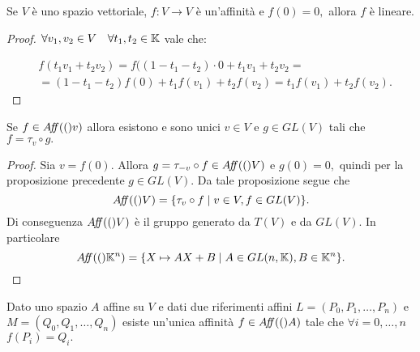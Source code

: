 \documentclass[a4paper,12pt]{article}
\newcommand{\Got}[1]{#1}
\newcommand{\got}[1]{{#1}}
\begin{document}
 \begin{proposition}
 \Got{Se} $\got{V}$ \Got{è uno spazio vettoriale,} $\got{f:V\to V}$ \Got{è un'affinità e} $\got{f(0)=0,}$ \Got{allora}
 $\got{f}$ \Got{è lineare.}
 \end{proposition}
 \begin{proof}
 \Got{}$\got{\forall v_1,v_2\in V\quad\forall t_1,t_2\in \K}$ \Got{vale che:}
 
 \begin{eqnarray*}
	& \got{f(t_1v_1+t_2v_2)=f((1-t_1-t_2)\cdotp 0+t_1v_1+t_2v_2=}\\
	& \got{=(1-t_1-t_2)f(0)+t_1f(v_1)+t_2f(v_2)=t_1f(v_1)+t_2f(v_2).}
 \end{eqnarray*}
 \end{proof}
 
 \begin{proposition}
 \Got{Se} $\got{f\in \Aff(v)}$ \Got{allora esistono e sono unici} $\got{v\in V}$ \Got{e} $\got{g\in GL(V)}$ \Got{tali che}
 $\got{f=\tau_v}\circ\got{ g.}$
 \end{proposition}
 
 \begin{proof}
 \Got{Sia} $\got{v=f(0).}$ \Got{Allora} $\got{g=\tau_{-v}}\circ\got{ f\in \Aff(V)}$ \Got{e} $\got{g(0)=0,}$
 \Got{quindi per la proposizione precedente} $\got{g\in GL(V).}$
 \Got{Da tale proposizione segue che} 
 $$
	\got{\Aff(V)=\{\tau_v}\circ\got{ f\;|\;v\in V,f\in GL(V)\}.}
 $$
 \Got{Di conseguenza} $\got{\Aff(V)}$ \Got{è il gruppo generato da} $\got{T(V)}$ \Got{e da} $\got{GL(V).}$
 \Got{In particolare} 
 $$
	\got{\Aff(\K^n)=\{X\mapsto AX+B \; |\; A\in GL(n,\K),B\in \K^n\}.}
 $$
 \end{proof}
 
\begin{proposition}
\Got{Dato uno spazio} $\got{A}$ \Got{affine su} $\got{V}$ \Got{e dati due riferimenti affini} $\got{L=(P_0,P_1,\ldots,P_n)}$
 \Got{e} $\got{M=(Q_0,Q_1,\ldots,Q_n)}$ \Got{esiste un'unica affinità} $\got{f\in \Aff(A)}$ \Got{tale che}
 $\got{\forall i=0,\ldots,n}$\\
 $\got{ f(P_i)=Q_i.}$
 \end{proposition}
 
\end{document}
